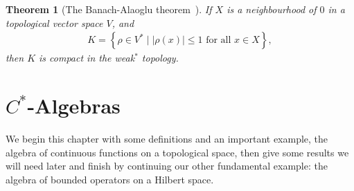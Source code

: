 \documentclass[11pt,a4paper]{report}
\theoremstyle{plain}
\newtheorem*{thm*}{Theorem}
\theoremstyle{definition}
\newcommand{\1}{\mathbbm{1}}
\begin{document}
\begin{thm*}[{The Banach-Alaoglu theorem~\cite{rudin91}}]
	If $X$ is a neighbourhood of $0$ in a topological vector space $V$, and
	\begin{align*}
		K=\left\{\rho\in V^\ast \mid |\rho(x)|\leq 1 \mbox{ for all } x \in X \right\},
	\end{align*}
	then $K$ is compact in the weak$^\ast$ topology.
\end{thm*}

\chapter{$C^\ast$-Algebras} \label{chapter:cstar}
We begin this chapter with some definitions and an important example, the 
algebra of continuous functions on a topological space, then give some results 
we will need later and finish by continuing our other fundamental example: the 
algebra of bounded operators on a Hilbert space.
\end{document}
